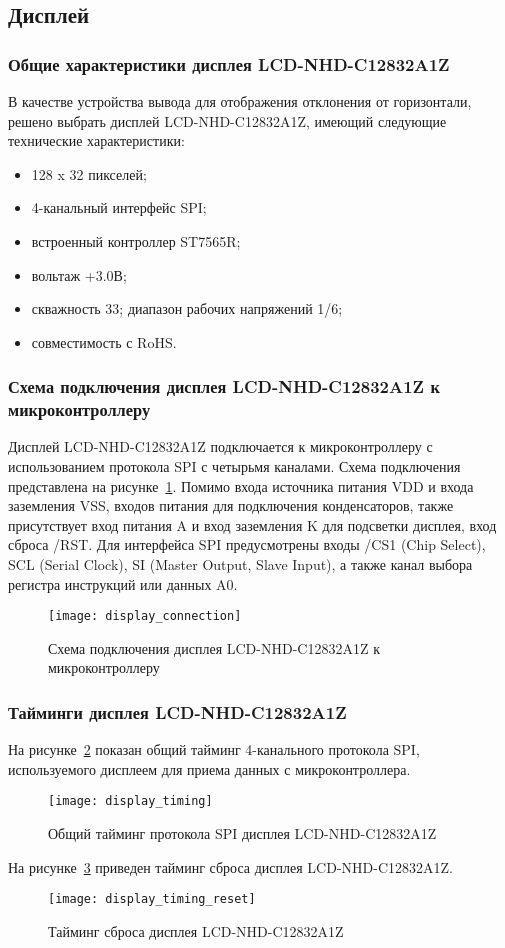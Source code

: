 \documentclass[document.tex]{subfiles}
\begin{document}
\clearpage
\subsection{Дисплей}
\subsubsection{Общие характеристики дисплея LCD-NHD-C12832A1Z}
В качестве устройства вывода для отображения отклонения от горизонтали, решено выбрать дисплей LCD-NHD-C12832A1Z, имеющий следующие технические характеристики:
\begin{itemize}
	\item 128 x 32 пикселей;
	\item 4-канальный интерфейс SPI;
	\item встроенный контроллер ST7565R;
	\item вольтаж +3.0В;
	\item скважность 33; диапазон рабочих напряжений 1/6;
	\item совместимость с RoHS.\cite{display}
\end{itemize}
\subsubsection{Схема подключения дисплея LCD-NHD-C12832A1Z к микроконтроллеру}
Дисплей LCD-NHD-C12832A1Z подключается к микроконтроллеру с использованием про\-токола SPI с четырьмя каналами. Схема подключения представлена на
рисунке~\ref{fig:display_connection}. Помимо входа источника питания VDD и входа заземления VSS, входов питания для подключения конденсаторов, также присутствует вход питания A и
вход заземления K для подсветки дисплея, вход сброса /RST. Для интерфейса SPI предусмотрены входы /CS1 (Chip Select), SCL (Serial Clock), SI (Master Output, Slave Input), а также
канал выбора регистра инструкций или данных A0.\cite{display, lcd_interfaces}

\begin{figure}[here]
\centering
\texttt{[image: display\_connection]}
\caption{Схема подключения дисплея LCD-NHD-C12832A1Z к микроконтроллеру}
\label{fig:display_connection}
\end{figure}

\clearpage
\subsubsection{Тайминги дисплея LCD-NHD-C12832A1Z}
На рисунке~\ref{fig:display_timing} показан общий тайминг 4-канального протокола SPI, используемого дисплеем для приема данных с микроконтроллера.
\begin{figure}[here]
\centering
\texttt{[image: display\_timing]}
\caption{Общий тайминг протокола SPI дисплея LCD-NHD-C12832A1Z}
\label{fig:display_timing}
\end{figure}

На рисунке~\ref{fig:display_timing_reset} приведен тайминг сброса дисплея LCD-NHD-C12832A1Z.
\begin{figure}[here]
\centering
\texttt{[image: display\_timing\_reset]}
\caption{Тайминг сброса дисплея LCD-NHD-C12832A1Z}
\label{fig:display_timing_reset}
\end{figure}
\end{document}
